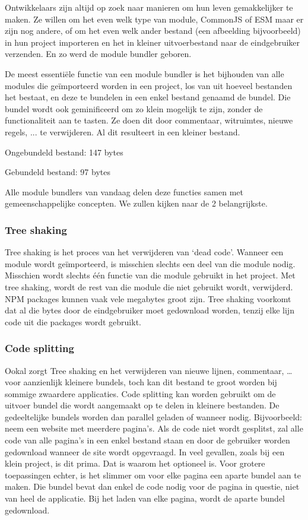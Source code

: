 Ontwikkelaars zijn altijd op zoek naar manieren om hun leven gemakkelijker te maken. Ze willen om het even welk type van module, CommonJS of ESM maar er zijn nog andere, of om het even welk ander bestand (een afbeelding bijvoorbeeld) in hun project importeren en het in kleiner uitvoerbestand naar de eindgebruiker verzenden. En zo werd de module bundler geboren.

De meest essentiële functie van een module bundler is het bijhouden van alle modules die geïmporteerd worden in een project, los van uit hoeveel bestanden het bestaat, en deze te bundelen in een enkel bestand genaamd de bundel. Die bundel wordt ook geminificeerd om zo klein mogelijk te zijn, zonder de functionaliteit aan te tasten. Ze doen dit door commentaar, witruimtes, nieuwe regels, ... te verwijderen. Al dit resulteert in een kleiner bestand.

Ongebundeld bestand: 147 bytes

Gebundeld bestand: 97 bytes


Alle module bundlers van vandaag delen deze functies samen met gemeenschappelijke concepten. We zullen kijken naar de 2 belangrijkste. 

\subsubsection{Tree shaking}

Tree shaking is het proces van het verwijderen van ‘dead code’. Wanneer een module wordt geïmporteerd, is misschien slechts een deel van die module nodig. Misschien wordt slechts één functie van die module gebruikt in het project. Met tree shaking, wordt de rest van die module die niet gebruikt wordt, verwijderd. NPM packages kunnen vaak vele megabytes groot zijn. Tree shaking voorkomt dat al die bytes door de eindgebruiker moet gedownload worden, tenzij elke lijn code uit die packages wordt gebruikt. 

\subsubsection{Code splitting}

Ookal zorgt Tree shaking en het verwijderen van nieuwe lijnen, commentaar, … voor aanzienlijk kleinere bundels, toch kan dit bestand te groot worden bij sommige zwaardere applicaties. Code splitting kan worden gebruikt om de uitvoer bundel die wordt aangemaakt op te delen in kleinere bestanden. De gedeeltelijke bundels worden dan parallel geladen of wanneer nodig. Bijvoorbeeld: neem een website met meerdere pagina's. Als de code niet wordt gesplitst, zal alle code van alle pagina's in een enkel bestand staan en door de gebruiker worden gedownload wanneer de site wordt opgevraagd. In veel gevallen, zoals bij een klein project, is dit prima. Dat is waarom het optioneel is. Voor grotere toepassingen echter, is het slimmer om voor elke pagina een aparte bundel aan te maken. Die bundel bevat dan enkel de code nodig voor de pagina in questie, niet van heel de applicatie. Bij het laden van elke pagina, wordt de aparte bundel gedownload.


